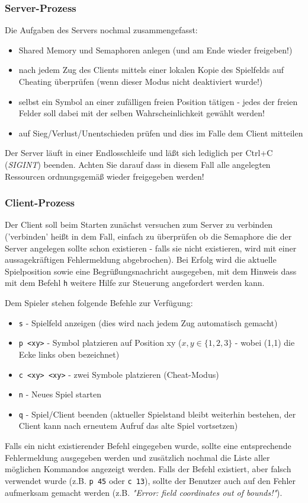 \documentclass{article}
\begin{document}
\subsubsection*{Server-Prozess}
Die Aufgaben des Servers nochmal zusammengefasst:
\begin{itemize}
\item Shared Memory und Semaphoren anlegen (und am Ende wieder freigeben!)
\item nach jedem Zug des Clients mittels einer lokalen Kopie des Spielfelds auf Cheating überprüfen (wenn
  dieser Modus nicht deaktiviert wurde!)
\item selbst ein Symbol an einer zufälligen freien Position tätigen - jedes der freien Felder soll dabei
      mit der selben Wahrscheinlichkeit gewählt werden!
\item auf Sieg/Verlust/Unentschieden prüfen und dies im Falle dem Client mitteilen
\end{itemize}
Der Server läuft in einer Endlosschleife und läßt sich lediglich per
Ctrl+C (\textit{SIGINT}) beenden. Achten Sie darauf dass in diesem Fall
alle angelegten Ressourcen ordnungsgemäß wieder freigegeben werden!

\subsubsection*{Client-Prozess}
Der Client soll beim Starten zunächst versuchen zum Server zu verbinden
('verbinden' heißt in dem Fall, einfach zu überprüfen ob die Semaphore
die der Server angelegen sollte schon existieren - falls sie nicht existieren,
wird mit einer aussagekräftigen Fehlermeldung abgebrochen). Bei Erfolg wird die aktuelle
Spielposition sowie eine
Begrüßungsnachricht ausgegeben, mit dem Hinweis dass mit dem Befehl \texttt{h}
weitere Hilfe zur Steuerung angefordert werden kann.

Dem Spieler stehen folgende Befehle zur Verfügung:
\begin{itemize}
	\item \texttt{s} - Spielfeld anzeigen (dies wird nach jedem Zug automatisch gemacht)
	\item \texttt{p <xy>} - Symbol platzieren auf Position xy ($ x,y \in \{1,2,3\} $ - wobei (1,1) die Ecke links oben bezeichnet)
	\item \texttt{c <xy> <xy>} - zwei Symbole platzieren (Cheat-Modus)
	\item \texttt{n} - Neues Spiel starten
	\item \texttt{q} - Spiel/Client beenden (aktueller Spielstand bleibt weiterhin bestehen, der Client kann nach erneutem Aufruf das alte Spiel vortsetzen)
\end{itemize}
Falls ein nicht existierender Befehl eingegeben wurde, sollte eine entsprechende
Fehlermeldung ausgegeben werden und zusätzlich nochmal die Liste aller möglichen
Kommandos angezeigt werden. Falls der Befehl existiert, aber falsch verwendet wurde
(z.B. \texttt{p 45} oder \texttt{c 13}), sollte der Benutzer auch auf den Fehler
aufmerksam gemacht werden (z.B. \textit{"Error: field coordinates out of bounds!"}).
\end{document}
